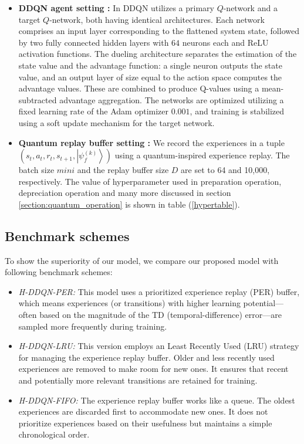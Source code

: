\documentclass[journal]{IEEEtran}
\begin{document}
\begin{itemize}
    \item \textbf{DDQN agent setting :}
    In DDQN utilizes a primary $Q$-network and a target $Q$-network, both having identical architectures. Each network comprises an input layer corresponding to the flattened system state, followed by two fully connected hidden layers with $64$ neurons each and ReLU activation functions. The dueling architecture separates the estimation of the state value and the advantage function: a single neuron outputs the state value, and an output layer of size equal to the action space computes the advantage values. These are combined to produce Q-values using a mean-subtracted advantage aggregation. The networks are optimized utilizing a fixed learning rate of the Adam optimizer \textbf{$0.001$}, and training is stabilized using a soft update mechanism for the target network.
    \item \textbf{Quantum replay buffer setting :}
   We record the experiences in a tuple $(s_t,a_t,r_t,s_{t+1}, \left |{\psi _{f}^{(k)}}\right \rangle )$ using a quantum-inspired experience replay. The batch size $mini$ and the replay buffer size $D$ are set to 64 and 10,000, respectively. The value of hyperparameter used in preparation operation, depreciation operation and many more discussed in section \ref{section:quantum_operation} is shown in table (\ref{hypertable}). 
\end{itemize}

\subsection{Benchmark schemes}
To show the superiority of our model, we compare our proposed model with following benchmark schemes:
\begin{itemize}
    \item{\textit{H-DDQN-PER:} This model uses a prioritized experience replay (PER) buffer, which means experiences (or transitions) with higher learning potential—often based on the magnitude of the TD (temporal-difference) error—are sampled more frequently during training.}
    \item{\textit{H-DDQN-LRU:} This version employs an Least Recently Used (LRU) strategy for managing the experience replay buffer. Older and less recently used experiences are removed to make room for new ones. It ensures that recent and potentially more relevant transitions are retained for training.}
    \item{\textit{H-DDQN-FIFO:} The experience replay buffer works like a queue. The oldest experiences are discarded first to accommodate new ones. It does not prioritize experiences based on their usefulness but maintains a simple chronological order.}
\end{itemize}
\end{document}
